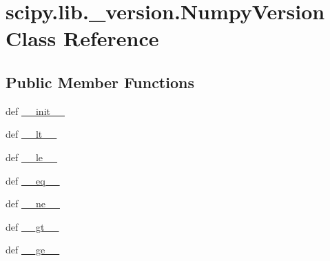 \hypertarget{classscipy_1_1lib_1_1__version_1_1NumpyVersion}{}\section{scipy.\+lib.\+\_\+version.\+Numpy\+Version Class Reference}
\label{classscipy_1_1lib_1_1__version_1_1NumpyVersion}
\subsection*{Public Member Functions}
\begin{DoxyCompactItemize}
\item 
def \hyperlink{classscipy_1_1lib_1_1__version_1_1NumpyVersion_aae467fa8ea5786b0db3d1d7f5cc3cd36}{\+\_\+\+\_\+init\+\_\+\+\_\+}
\item 
def \hyperlink{classscipy_1_1lib_1_1__version_1_1NumpyVersion_ad97c202edd297085dfe551322704716c}{\+\_\+\+\_\+lt\+\_\+\+\_\+}
\item 
def \hyperlink{classscipy_1_1lib_1_1__version_1_1NumpyVersion_a6cb58ee344cbfdf3e158218300cafe7d}{\+\_\+\+\_\+le\+\_\+\+\_\+}
\item 
def \hyperlink{classscipy_1_1lib_1_1__version_1_1NumpyVersion_aa147eb4eb55617e12930c31738dc4715}{\+\_\+\+\_\+eq\+\_\+\+\_\+}
\item 
def \hyperlink{classscipy_1_1lib_1_1__version_1_1NumpyVersion_a33344eefbb1eacc3b416e84d69d6c6c6}{\+\_\+\+\_\+ne\+\_\+\+\_\+}
\item 
def \hyperlink{classscipy_1_1lib_1_1__version_1_1NumpyVersion_a48821a37d9328462bf42ffc7849c5cc5}{\+\_\+\+\_\+gt\+\_\+\+\_\+}
\item 
def \hyperlink{classscipy_1_1lib_1_1__version_1_1NumpyVersion_a5eaace85a4fa081923a60916d1eac5db}{\+\_\+\+\_\+ge\+\_\+\+\_\+}
\end{DoxyCompactItemize}
